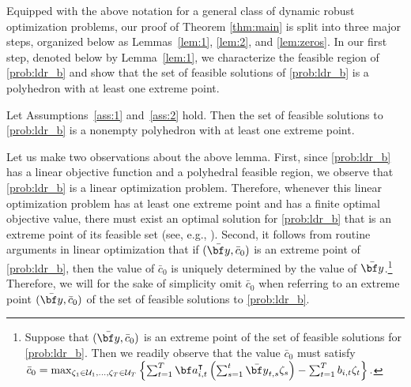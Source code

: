 \documentclass[nonblindrev,mnsc]{informs3} %
\newcommand{\ba}{{\bf a}}
\newcommand{\by}{{\bf y}}
\begin{document}
Equipped with the above notation for a general class of  dynamic robust optimization problems, our proof of Theorem \ref{thm:main} is split into three major steps, organized below as Lemmas~\ref{lem:1}, \ref{lem:2}, and \ref{lem:zeros}. 
In our first step, denoted below by Lemma~\ref{lem:1}, we characterize the feasible region of \eqref{prob:ldr_b}  and show that the set of feasible solutions of \eqref{prob:ldr_b} is a polyhedron with at least one extreme point.


\begin{lemma}\label{lem:1}
Let Assumptions~\ref{ass:1} and~\ref{ass:2} hold. Then  the set of feasible solutions to \eqref{prob:ldr_b} is a nonempty polyhedron with at least one extreme point. 
\end{lemma}
Let us make two observations about the above lemma. First, since \eqref{prob:ldr_b} has a linear objective function and a polyhedral feasible region, we observe that \eqref{prob:ldr_b} is a linear optimization problem. Therefore, whenever this linear optimization problem has at least one extreme point and has a finite optimal objective value, there must exist an optimal solution for \eqref{prob:ldr_b} that is an extreme point of its feasible set (see, e.g.,  \cite[Theorem 2.7]{bertsimas1997introduction}). 
Second, it follows from routine arguments in linear optimization that if $(\bar{\by},\bar{c}_0)$ is an extreme point  of \eqref{prob:ldr_b}, then the value of $\bar{c}_0$ is uniquely determined by the value of  $\bar{\by}$.\footnote{Suppose that $(\bar{\by},\bar{c}_0)$ is an extreme point of the set of feasible solutions for \eqref{prob:ldr_b}. Then we readily observe that the value $\bar{c}_0$ must  satisfy  $\bar{c}_0 = \max_{\zeta_1 \in \mathcal{U}_1,\ldots,\zeta_T \in \mathcal{U}_T}\left \{ \sum_{t=1}^T \ba_{i,t}^\intercal  \left(\sum_{s=1}^t \bar{\by}_{t,s} \zeta_s \right) - \sum_{t=1}^T b_{i,t}   \zeta_t  \right \}.$} Therefore, we will for the sake of simplicity omit $\bar{c}_0$ when referring to an extreme point $(\bar{\by},\bar{c}_0)$ of the set of feasible solutions to \eqref{prob:ldr_b}. 
\end{document}
